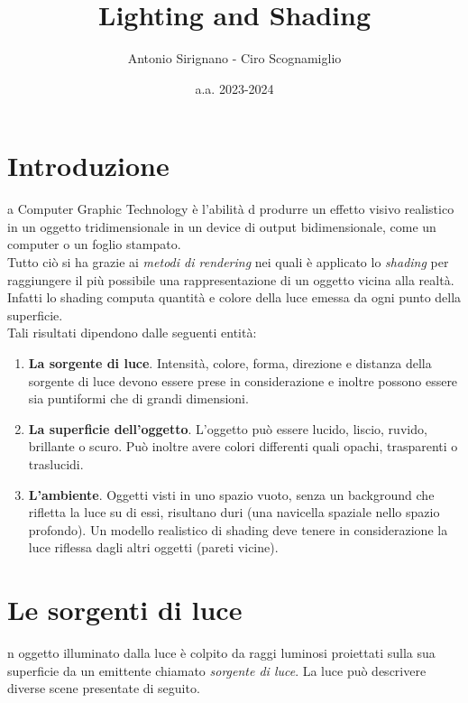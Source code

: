 \documentclass[9pt,a4paper,twoside]{tau}
\title{Lighting and Shading}
\author{Antonio Sirignano - Ciro Scognamiglio}
\date{a.a. 2023-2024}
\begin{document}
		
	\maketitle
	\thispagestyle{firststyle}
	\tauabstract
	\tableofcontents


\section{Introduzione}

    a Computer Graphic Technology è l'abilità d produrre un effetto visivo realistico in un oggetto tridimensionale in un device di output bidimensionale, come un computer o un foglio stampato.\\
    Tutto ciò si ha grazie ai \textit{metodi di rendering} nei quali è applicato lo \textit{shading} per raggiungere il più possibile una rappresentazione di un oggetto vicina alla realtà.\\ 
    Infatti lo shading computa quantità e colore della luce emessa da ogni punto della superficie.\\
    Tali risultati dipendono dalle seguenti entità:
    \begin{enumerate}
    	\item \textbf{La sorgente di luce}. Intensità, colore, forma, direzione e distanza della sorgente di luce devono essere prese in considerazione e inoltre possono essere sia puntiformi che di grandi dimensioni.
    	\item \textbf{La superficie dell'oggetto}. L'oggetto può essere lucido, liscio, ruvido, brillante o scuro. Può inoltre avere colori differenti quali opachi, trasparenti o traslucidi. 
    	\item \textbf{L'ambiente}. Oggetti visti in uno spazio vuoto, senza un background che rifletta la luce su di essi, risultano duri (una navicella spaziale nello spazio profondo). Un modello realistico di shading deve tenere in considerazione la luce riflessa dagli altri oggetti (pareti vicine).
    \end{enumerate}

\section{Le sorgenti di luce}
n oggetto illuminato dalla luce è colpito da raggi luminosi proiettati sulla sua superficie da un emittente chiamato \textit{sorgente di luce}. La luce può descrivere diverse scene presentate di seguito.
\end{document}
